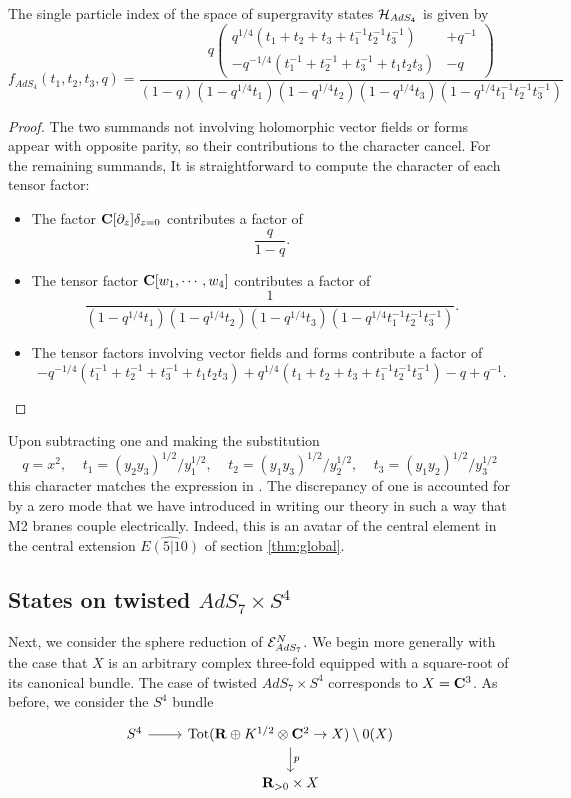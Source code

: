 \documentclass[../main.tex]{subfiles}
\begin{document}
\begin{prop}
The single particle index of the space of supergravity states $\mathcal{H}_{AdS_4}$ is given by 
\[
f_{AdS_4} (t_1, t_2, t_3, q)  = \frac{q\left (\begin{aligned} q^{1/4}(t_1+ t_2 + t_3+t_1^{-1}t_2^{-1}t_3^{-1}) &+ q^{-1} \\- q^{-1/4}(t_1^{-1}+ t_2^{-1} + t_3^{-1}+t_1t_2t_3) &- q   \end{aligned}\right)}{(1-q)(1-q^{1/4}t_1)(1-q^{1/4}t_2)(1-q^{1/4}t_3)(1-q^{1/4}t_1^{-1}t_2^{-1}t_3^{-1})}
\]
\end{prop}
\begin{proof}
The two summands not involving holomorphic vector fields or forms appear with opposite parity, so their contributions to the character cancel. For the remaining summands, It is straightforward to compute the character of each tensor factor:
\begin{itemize}
\item The factor $\mathbf{C}[\partial_z]\delta_{z=0}$ contributes a factor of \[\frac{q}{1-q}.\]
\item The tensor factor $\mathbf{C}[w_1,\cdots, w_4]$ contributes a factor of \[\frac{1}{(1-q^{1/4}t_1)(1-q^{1/4}t_2)(1-q^{1/4}t_3)(1-q^{1/4}t_1^{-1}t_2^{-1}t_3^{-1})}.\]
\item The tensor factors involving vector fields and forms contribute a factor of \[-q^{-1/4}(t_1^{-1}+ t_2^{-1} + t_3^{-1}+t_1t_2t_3) + q^{1/4}(t_1+ t_2 + t_3+t_1^{-1}t_2^{-1}t_3^{-1}) - q + q^{-1}.\]
\end{itemize}
\end{proof}

\parsec[] Upon subtracting one and making the substitution
\[
q = x^2, \ \ \ \ \ t_1 = (y_2y_3)^{1/2}/y_1^{1/2}, \ \ \ \ \ t_2 = (y_1y_3)^{1/2}/y_2^{1/2}, \ \ \ \ \ t_3 = (y_1y_2)^{1/2}/y_3^{1/2}
\]
this character matches the expression in \cite[equation (2.17)]{Bhattacharya:2008zy}. The discrepancy of one is accounted for by a zero mode that we have introduced in writing our theory in such a way that M2 branes couple electrically. Indeed, this is an avatar of the central element in the central extension $\widehat{E(5|10)}$ of section \ref{thm:global}.

\subsection{States on twisted $AdS_7\times S^{4}$}
\label{s:ads7states}
Next, we consider the sphere reduction of $\mathcal{E}^N_{AdS_7}$.
We begin more generally with the case that $X$ is an arbitrary complex three-fold equipped with a square-root of its canonical bundle.
The case of twisted $AdS_7 \times S^4$ corresponds to $X = \mathbf{C}^3$.
As before, we consider the $S^4$ bundle 
\[
\begin{tikzcd}
S^4 \ar[r] & \operatorname{Tot} (\R\oplus K^{1/2}\otimes \C^2\to X) \setminus 0(X) \ar[d, "p"] \\ & \R_{>0}\times X
\end{tikzcd}
\]
\end{document}
